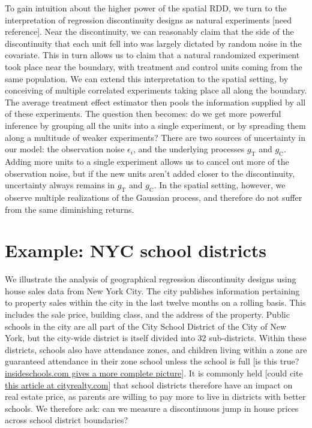 \documentclass[letter]{article}
\newcommand{\treat}{\mathrm{T}}
\newcommand{\ctrol}{\mathrm{C}}
\begin{document}
To gain intuition about the higher power of the spatial RDD, we turn to the interpretation of regression discontinuity designs as natural experiments {[}need reference{]}.
Near the discontinuity, we can reasonably claim that the side of the discontinuity that each unit fell into was largely dictated by random noise in the covariate.
This in turn allows us to claim that a natural randomized experiment took place near the boundary, with treatment and control units coming from the same population.
We can extend this interpretation to the spatial setting, by conceiving of multiple correlated experiments taking place all along the boundary.
The average treatment effect estimator then pools the information supplied by all of these experiments.
The question then becomes: do we get more powerful inference by grouping all the units into a single experiment, or by spreading them along a multitude of weaker experiments?
There are two sources of uncertainty in our model: the observation noise \(\epsilon_i\), and the underlying processes \(g_\treat{}\) and \(g_\ctrol{}\). Adding more units to a single experiment allows us to cancel out more of the observation noise, but if the new units aren't added closer to the discontinuity, uncertainty always remains in \(g_\treat{}\) and \(g_\ctrol{}\). In the spatial setting, however, we observe multiple realizations of the Gaussian process, and therefore do not suffer from the same diminishing returns.
    


    	\section{Example: NYC school districts}\label{example-nyc-school-districts}

We illustrate the analysis of geographical regression discontinuity designs using house sales data from New York City.
The city publishes information pertaining to property sales within the city in the last twelve months on a rolling basis.
This includes the sale price, building class, and the address of the property.
Public schools in the city are all part of the City School District of the City of New York, but the city-wide district is itself divided into 32 sub-districts.
Within these districts, schools also have attendance zones, and children living within a zone are guaranteed attendance in their zone school unless the school is full {[}is this true? \href{http://insideschools.org/elementary/how-to-apply}{insideschools.com gives a more complete picture}{]}.
It is commonly held {[}could cite \href{https://www.cityrealty.com/nyc/market-insight/features/trending-in-ny/buying-renting-school-zone-district-what-you-need-know/3661}{this article at cityrealty.com}{]} that school districts therefore have an impact on real estate price, as parents are willing to pay more to live in districts with better schools.
We therefore ask: can we measure a discontinuous jump in house prices across school district boundaries?
    
\end{document}
